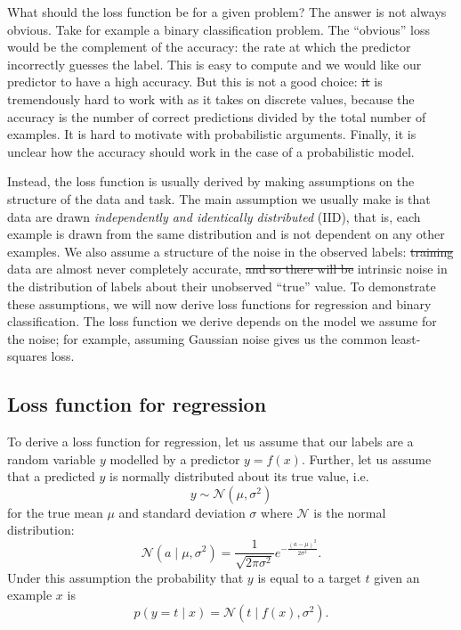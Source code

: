 \documentclass[11pt, a4paper]{book}
\newcommand{\defn}[1]{\emph{#1}}
\providecommand{\DIFaddtex}[1]{{\protect\color{blue}\uwave{#1}}} %
\providecommand{\DIFdeltex}[1]{{\protect\color{red}\sout{#1}}}                      %
\providecommand{\DIFaddbegin}{} %
\providecommand{\DIFaddend}{} %
\providecommand{\DIFdelbegin}{} %
\providecommand{\DIFdelend}{} %
\providecommand{\DIFadd}[1]{\texorpdfstring{\DIFaddtex{#1}}{#1}} %
\providecommand{\DIFdel}[1]{\texorpdfstring{\DIFdeltex{#1}}{}} %
\newcommand{\DIFscaledelfig}{0.5}
\newlength{\DIFdelgraphicswidth} %
\newlength{\DIFdelgraphicsheight} %
\newcommand{\DIFaddincludegraphics}[2][]{{\color{blue}\fbox{\DIFOincludegraphics[#1]{#2}}}} %
\newcommand{\DIFdelincludegraphics}[2][]{%
\sbox{\DIFdelgraphicsbox}{\DIFOincludegraphics[#1]{#2}}%
\settoboxwidth{\DIFdelgraphicswidth}{\DIFdelgraphicsbox} %
\settoboxtotalheight{\DIFdelgraphicsheight}{\DIFdelgraphicsbox} %
\scalebox{\DIFscaledelfig}{%
\parbox[b]{\DIFdelgraphicswidth}{\usebox{\DIFdelgraphicsbox}\\[-\baselineskip] \rule{\DIFdelgraphicswidth}{0em}}\llap{\resizebox{\DIFdelgraphicswidth}{\DIFdelgraphicsheight}{%
\setlength{\unitlength}{\DIFdelgraphicswidth}%
\begin{picture}(1,1)%
\thicklines\linethickness{2pt} %
{\color[rgb]{1,0,0}\put(0,0){\framebox(1,1){}}}%
{\color[rgb]{1,0,0}\put(0,0){\line( 1,1){1}}}%
{\color[rgb]{1,0,0}\put(0,1){\line(1,-1){1}}}%
\end{picture}%
}\hspace*{3pt}}} %
} %
\DeclareRobustCommand{\DIFaddbegin}{\DIFOaddbegin \let\includegraphics\DIFaddincludegraphics} %
\DeclareRobustCommand{\DIFaddend}{\DIFOaddend \let\includegraphics\DIFOincludegraphics} %
\DeclareRobustCommand{\DIFdelbegin}{\DIFOdelbegin \let\includegraphics\DIFdelincludegraphics} %
\DeclareRobustCommand{\DIFdelend}{\DIFOaddend \let\includegraphics\DIFOincludegraphics} %
\begin{document}
    What should the loss function be for a given problem? The answer is not always obvious. Take for example a binary classification problem. The ``obvious'' loss would be the complement of the accuracy: the rate at which the predictor incorrectly guesses the label. This is easy to compute and we would like our predictor to have a high accuracy. But this is not a good choice: \DIFdelbegin \DIFdel{it }\DIFdelend \DIFaddbegin \DIFadd{It }\DIFaddend is tremendously hard to work with as it takes on discrete values, because the accuracy is the number of correct predictions divided by the total number of examples. It is hard to motivate with probabilistic arguments. Finally, it is unclear how the accuracy should work in the case of a probabilistic model.

    Instead, the loss function is usually derived by making assumptions on the structure of the data and task. The main assumption we usually make is that data are drawn \defn{independently and identically distributed} (IID), that is, each example is drawn from the same distribution and is not dependent on any other examples. We also assume a structure of the noise in the observed labels: \DIFdelbegin \DIFdel{training }\DIFdelend \DIFaddbegin \DIFadd{Training }\DIFaddend data are almost never completely accurate, \DIFdelbegin \DIFdel{and so there will be }\DIFdelend \DIFaddbegin \DIFadd{so there is usually }\DIFaddend intrinsic noise in the distribution of labels about their unobserved ``true'' value. To demonstrate these assumptions, we will now derive loss functions for regression and binary classification. The loss function we derive depends on the model we assume for the noise; for example, assuming Gaussian noise gives us the common least-squares loss.

        \subsection{Loss function for regression}
        \label{sec:loss-regression}

            To derive a loss function for regression, let us assume that our labels are a random variable $y$ modelled by a predictor $y = f(x)$. Further, let us assume that a predicted $y$ is normally distributed about its true value, i.e.
            \begin{equation}
                y \sim \mathcal N(\mu, \sigma^2)
            \end{equation}
            for the true mean $\mu$ and standard deviation $\sigma$ where $\mathcal N$ is the normal distribution:
            \begin{equation}
                \mathcal N(a \mid \mu, \sigma^2) = \frac{1}{\sqrt{2\pi\sigma^2}} e^{-\frac{(a - \mu)^2}{2\sigma^2}}.
            \end{equation}
            Under this assumption the probability that $y$ is equal to a target $t$ given an example $x$ is
            \begin{equation}
                p(y = t \mid x) = \mathcal N(t \mid f(x), \sigma^2).
            \end{equation}
\end{document}
